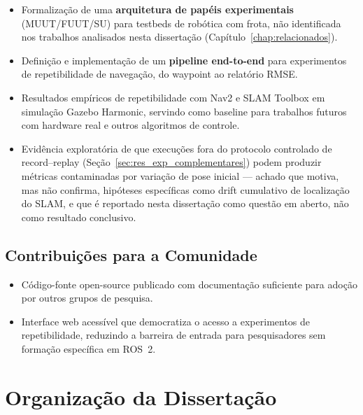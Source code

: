 \begin{itemize}
    \item Formalização de uma \textbf{arquitetura de papéis experimentais}
    (MUUT/FUUT/SU) para testbeds de robótica com frota, não identificada nos
    trabalhos analisados nesta dissertação (Capítulo~\ref{chap:relacionados}).

    \item Definição e implementação de um \textbf{pipeline end-to-end} para
    experimentos de repetibilidade de navegação, do waypoint ao relatório RMSE.

    \item Resultados empíricos de repetibilidade com Nav2 e SLAM Toolbox em
    simulação Gazebo Harmonic, servindo como baseline para trabalhos futuros
    com hardware real e outros algoritmos de controle.

    \item Evidência exploratória de que execuções fora do protocolo controlado
    de record--replay (Seção~\ref{sec:res_exp_complementares}) podem produzir
    métricas contaminadas por variação de pose inicial --- achado que motiva,
    mas não confirma, hipóteses específicas como drift cumulativo de localização
    do SLAM, e que é reportado nesta dissertação como questão em aberto, não
    como resultado conclusivo.
\end{itemize}

\subsection{Contribuições para a Comunidade}

\begin{itemize}
    \item Código-fonte open-source publicado com documentação suficiente para
    adoção por outros grupos de pesquisa.

    \item Interface web acessível que democratiza o acesso a experimentos de
    repetibilidade, reduzindo a barreira de entrada para pesquisadores sem
    formação específica em ROS~2.
\end{itemize}

\section{Organização da Dissertação}
\label{sec:organizacao}

